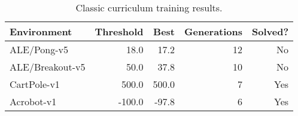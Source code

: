 \begin{table}[!ht]
\centering
\begin{tabular}{lrrrr}
\hline
Environment & Threshold & Best & Generations & Solved? \\
\hline
ALE/Pong-v5 & 18.0 & 17.2 & 12 & No \\
ALE/Breakout-v5 & 50.0 & 37.8 & 10 & No \\
CartPole-v1 & 500.0 & 500.0 & 7 & Yes \\
Acrobot-v1 & -100.0 & -97.8 & 6 & Yes \\
\hline
\end{tabular}
\caption{Classic curriculum training results.}
\label{tab:classic}
\end{table}
